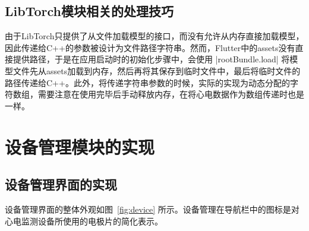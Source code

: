 \subsection{LibTorch模块相关的处理技巧}\label{subsec:libtorch}

由于LibTorch只提供了从文件加载模型的接口，而没有允许从内存直接加载模型，因此传递给C++的参数被设计为文件路径字符串。然而，Flutter中的assets没有直接提供路径，于是在应用启动时的初始化步骤中，会使用 |rootBundle.load| 将模型文件先从assets加载到内存，然后再将其保存到临时文件中，最后将临时文件的路径传递给C++。此外，将传递字符串参数的时候，实际的实现为动态分配的字符数组，需要注意在使用完毕后手动释放内存，在将心电数据作为数组传递时也是一样。


\section{设备管理模块的实现}\label{sec:device}

\subsection{设备管理界面的实现}\label{subsec:device-ui}

设备管理界面的整体外观如图~\ref{fig:device} 所示。设备管理在导航栏中的图标是对心电监测设备所使用的电极片的简化表示。

